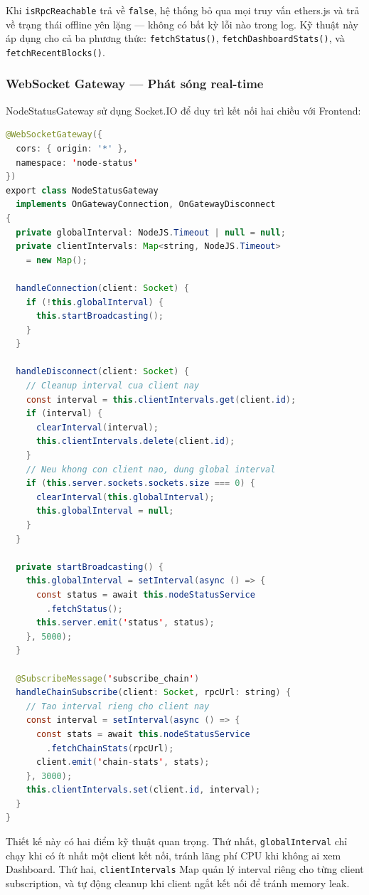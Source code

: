 Khi \texttt{isRpcReachable} trả về \texttt{false}, hệ thống bỏ qua mọi truy vấn ethers.js và trả về trạng thái offline yên lặng --- không có bất kỳ lỗi nào trong log. Kỹ thuật này áp dụng cho cả ba phương thức: \texttt{fetchStatus()}, \texttt{fetchDashboardStats()}, và \texttt{fetchRecentBlocks()}.

\subsubsection{WebSocket Gateway --- Phát sóng real-time}

NodeStatusGateway sử dụng Socket.IO để duy trì kết nối hai chiều với Frontend:

\begin{lstlisting}[caption={NodeStatusGateway --- Quản lý kết nối và phát sóng}, label={lst:ws_gateway}, language=Java]
@WebSocketGateway({
  cors: { origin: '*' },
  namespace: 'node-status'
})
export class NodeStatusGateway
  implements OnGatewayConnection, OnGatewayDisconnect
{
  private globalInterval: NodeJS.Timeout | null = null;
  private clientIntervals: Map<string, NodeJS.Timeout>
    = new Map();

  handleConnection(client: Socket) {
    if (!this.globalInterval) {
      this.startBroadcasting();
    }
  }

  handleDisconnect(client: Socket) {
    // Cleanup interval cua client nay
    const interval = this.clientIntervals.get(client.id);
    if (interval) {
      clearInterval(interval);
      this.clientIntervals.delete(client.id);
    }
    // Neu khong con client nao, dung global interval
    if (this.server.sockets.sockets.size === 0) {
      clearInterval(this.globalInterval);
      this.globalInterval = null;
    }
  }

  private startBroadcasting() {
    this.globalInterval = setInterval(async () => {
      const status = await this.nodeStatusService
        .fetchStatus();
      this.server.emit('status', status);
    }, 5000);
  }

  @SubscribeMessage('subscribe_chain')
  handleChainSubscribe(client: Socket, rpcUrl: string) {
    // Tao interval rieng cho client nay
    const interval = setInterval(async () => {
      const stats = await this.nodeStatusService
        .fetchChainStats(rpcUrl);
      client.emit('chain-stats', stats);
    }, 3000);
    this.clientIntervals.set(client.id, interval);
  }
}
\end{lstlisting}

Thiết kế này có hai điểm kỹ thuật quan trọng. Thứ nhất, \texttt{globalInterval} chỉ chạy khi có ít nhất một client kết nối, tránh lãng phí CPU khi không ai xem Dashboard. Thứ hai, \texttt{clientIntervals} Map quản lý interval riêng cho từng client subscription, và tự động cleanup khi client ngắt kết nối để tránh memory leak.


